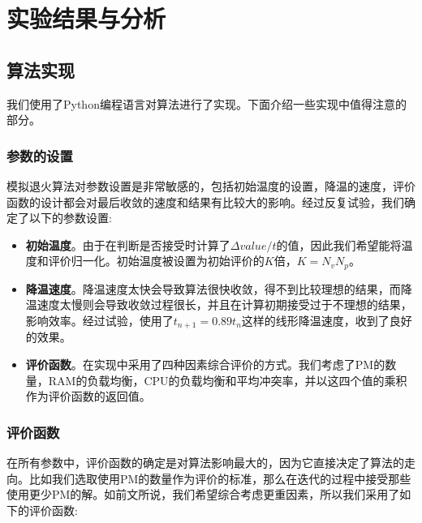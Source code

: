 
\chapter{实验结果与分析}
\label{chap:result}

\section{算法实现}
\label{sec:implementation}

我们使用了Python编程语言对算法进行了实现。下面介绍一些实现中值得注意的部分。

\subsection*{参数的设置}
\label{sec:config}

模拟退火算法对参数设置是非常敏感的，包括初始温度的设置，降温的速度，评价函数的设计都会对最后收敛的速度和结果有比较大的影响。经过反复试验，我们确定了以下的参数设置:

\begin{itemize}
\item \textbf{初始温度}。由于在判断是否接受时计算了$\Delta value/t$的值，因此我们希望能将温度和评价归一化。初始温度被设置为初始评价的$K$倍，$K = N_v N_p$。
\item \textbf{降温速度}。降温速度太快会导致算法很快收敛，得不到比较理想的结果，而降温速度太慢则会导致收敛过程很长，并且在计算初期接受过于不理想的结果，影响效率。经过试验，使用了$t_{n+1} = 0.89t_n$这样的线形降温速度，收到了良好的效果。
\item \textbf{评价函数}。在实现中采用了四种因素综合评价的方式。我们考虑了PM的数量，RAM的负载均衡，CPU的负载均衡和平均冲突率，并以这四个值的乘积作为评价函数的返回值。\label{evalutation}
\end{itemize}

\subsection*{评价函数}
\label{sec:evaluation-function}

在所有参数中，评价函数的确定是对算法影响最大的，因为它直接决定了算法的走向。比如我们选取使用PM的数量作为评价的标准，那么在迭代的过程中接受那些使用更少PM的解。如前文所说，我们希望综合考虑更重因素，所以我们采用了如下的评价函数:

